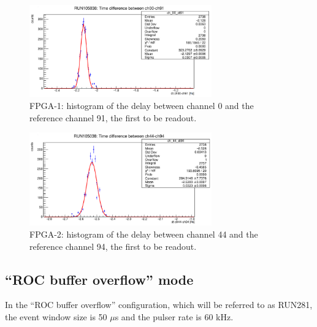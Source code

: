   \begin{figure}[!h]
          \centering
      \includegraphics[width=0.7\textwidth]{figures/png/Screenshot from 2023-12-03 11-50-50.png}
      \caption{FPGA-1: histogram of the delay between channel 0 and the reference channel 91, the first to be readout.}
      \label{fig:delay1}
    \end{figure}
    \begin{figure}[!h]
          \centering
      \includegraphics[width=0.7\textwidth]{figures/png/Screenshot from 2023-12-03 11-50-33.png}
      \caption{FPGA-2: histogram of the delay between channel 44 and the reference channel 94, the first to be readout.}
      \label{fig:delay2}
    \end{figure}
\subsection{``ROC buffer overflow'' mode}
In the ``ROC buffer overflow'' configuration, which will be referred to as RUN281, the event window size is 50 $\mu$s
and the pulser rate is 60 kHz.
